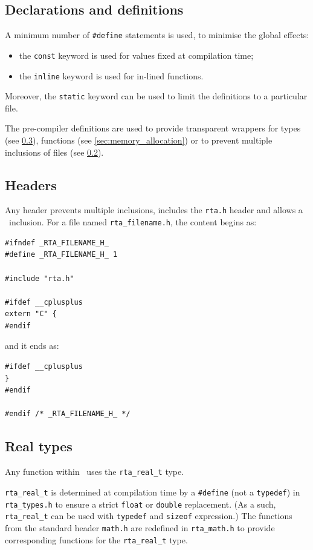 \documentclass[a4paper, twoside]{article}
\begin{document}
\subsection{Declarations and definitions}
\label{sec:defines}

A minimum number of \texttt{\#define} statements is used, to minimise
the global effects:
\begin{itemize}
\item the \texttt{const} keyword is used for values fixed at
  compilation time;
\item the \texttt{inline} keyword is used for in-lined functions.
\end{itemize}
Moreover, the \texttt{static} keyword can be used to limit the
definitions to a particular file.

The pre-compiler definitions are used to provide transparent
wrappers for types (see \ref{sec:real_types}), functions (see
\ref{sec:memory_allocation}) or to prevent multiple inclusions of files
(see \ref{sec:headers}).

\subsection{Headers}
\label{sec:headers}

Any header prevents multiple inclusions, includes the \texttt{rta.h}
header and allows a \Cpp\ inclusion. For a file named
\texttt{rta\_filename.h}, the content begins as:
\begin{verbatim}
#ifndef _RTA_FILENAME_H_
#define _RTA_FILENAME_H_ 1

#include "rta.h"

#ifdef __cplusplus
extern "C" {
#endif
\end{verbatim}

and it ends as:
\begin{verbatim}
#ifdef __cplusplus
}
#endif

#endif /* _RTA_FILENAME_H_ */
\end{verbatim}

\subsection{Real types}
\label{sec:real_types}

Any function within \rta\ uses the \texttt{rta\_real\_t} type.

\texttt{rta\_real\_t} is determined at compilation time by a
\texttt{\#define} (not a \texttt{typedef}) in \texttt{rta\_types.h} to
ensure a strict \texttt{float} or \texttt{double} replacement. (As a
such, \texttt{rta\_real\_t} can be used with \texttt{typedef} and
\texttt{sizeof} expression.) The functions from the standard header
\texttt{math.h} are redefined in \texttt{rta\_math.h} to provide
corresponding functions for the \texttt{rta\_real\_t} type. 
\end{document}
